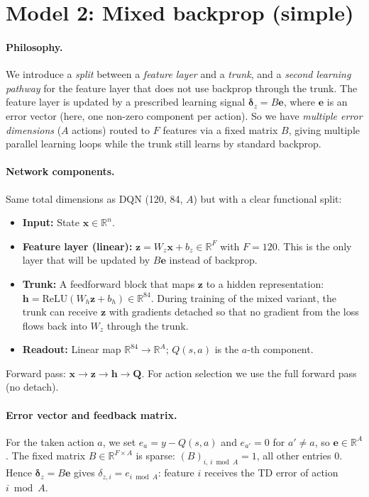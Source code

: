 \documentclass[11pt]{article}
\begin{document}
\section{Model 2: Mixed backprop (simple)}

\paragraph{Philosophy.} We introduce a \emph{split} between a \emph{feature layer} and a \emph{trunk}, and a \emph{second learning pathway} for the feature layer that does not use backprop through the trunk. The feature layer is updated by a prescribed learning signal $\boldsymbol{\delta}_z = B\mathbf{e}$, where $\mathbf{e}$ is an error vector (here, one non-zero component per action). So we have \emph{multiple error dimensions} ($A$ actions) routed to $F$ features via a fixed matrix $B$, giving multiple parallel learning loops while the trunk still learns by standard backprop.

\paragraph{Network components.} Same total dimensions as DQN (120, 84, $A$) but with a clear functional split:
\begin{itemize}
\item \textbf{Input:} State $\mathbf{x} \in \mathbb{R}^n$.
\item \textbf{Feature layer (linear):} $\mathbf{z} = W_z \mathbf{x} + b_z \in \mathbb{R}^F$ with $F=120$. This is the only layer that will be updated by $B\mathbf{e}$ instead of backprop.
\item \textbf{Trunk:} A feedforward block that maps $\mathbf{z}$ to a hidden representation: $\mathbf{h} = \mathrm{ReLU}(W_h \mathbf{z} + b_h) \in \mathbb{R}^{84}$. During training of the mixed variant, the trunk can receive $\mathbf{z}$ with gradients detached so that no gradient from the loss flows back into $W_z$ through the trunk.
\item \textbf{Readout:} Linear map $\mathbb{R}^{84} \to \mathbb{R}^A$; $Q(s,a)$ is the $a$-th component.
\end{itemize}
Forward pass: $\mathbf{x} \to \mathbf{z} \to \mathbf{h} \to \mathbf{Q}$. For action selection we use the full forward pass (no detach).

\paragraph{Error vector and feedback matrix.} For the taken action $a$, we set $e_a = y - Q(s,a)$ and $e_{a'}=0$ for $a' \neq a$, so $\mathbf{e} \in \mathbb{R}^A$. The fixed matrix $B \in \mathbb{R}^{F \times A}$ is sparse: $(B)_{i,\, i \bmod A} = 1$, all other entries 0. Hence $\boldsymbol{\delta}_z = B\mathbf{e}$ gives $\delta_{z,i} = e_{i \bmod A}$: feature $i$ receives the TD error of action $i \bmod A$.
\end{document}
